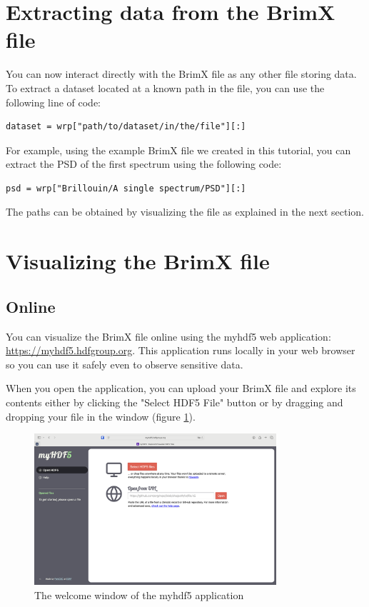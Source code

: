 \documentclass{article}
\begin{document}
\section{Extracting data from the BrimX file}

You can now interact directly with the BrimX file as any other file storing data. To extract a dataset located at a known path in the file, you can use the following line of code:
\begin{lstlisting}
dataset = wrp["path/to/dataset/in/the/file"][:]
\end{lstlisting}

For example, using the example BrimX file we created in this tutorial, you can extract the PSD of the first spectrum using the following code:
\begin{lstlisting}
psd = wrp["Brillouin/A single spectrum/PSD"][:]
\end{lstlisting}

The paths can be obtained by visualizing the file as explained in the next section.

\section{Visualizing the BrimX file}

\subsection{Online}

You can visualize the BrimX file online using the myhdf5 web application: \url{https://myhdf5.hdfgroup.org}. This application runs locally in your web browser so you can use it safely even to observe sensitive data.

When you open the application, you can upload your BrimX file and explore its contents either by clicking the "Select HDF5 File" button or by dragging and dropping your file in the window (figure \ref{fig:my_hdf5_welcome}). 

\begin{figure}[H]
    \centering
    \includegraphics[width=0.8\textwidth]{img/MyHDF5_welcome_window.png}
    \caption{The welcome window of the myhdf5 application}
    \label{fig:my_hdf5_welcome}
\end{figure}
\end{document}
